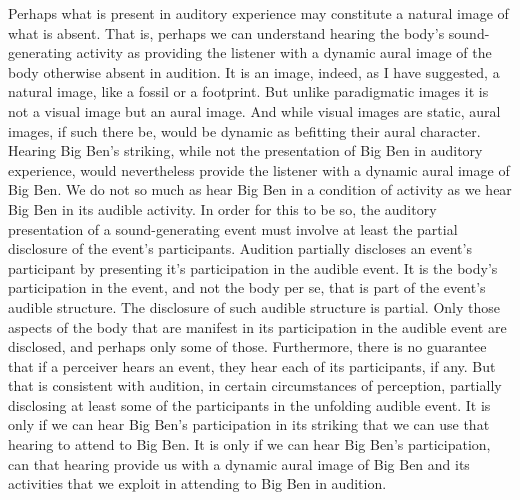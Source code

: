 \documentclass[12pt]{article}
\begin{document}
Perhaps what is present in auditory experience may constitute a natural image of what is absent. That is, perhaps we can understand hearing the body’s sound-generating activity as providing the listener with a dynamic aural image of the body otherwise absent in audition. It is an image, indeed, as I have suggested, a natural image, like a fossil or a footprint. But unlike paradigmatic images it is not a visual image but an aural image. And while visual images are static, aural images, if such there be, would be dynamic as befitting their aural character. Hearing Big Ben’s striking, while not the presentation of Big Ben in auditory experience, would nevertheless provide the listener with a dynamic aural image of Big Ben. We do not so much as hear Big Ben in a condition of activity as we hear Big Ben in its audible activity. In order for this to be so, the auditory presentation of a sound-generating event must involve at least the partial disclosure of the event’s participants. Audition partially discloses an event’s participant by presenting it's participation in the audible event. It is the body’s participation in the event, and not the body per se, that is part of the event’s audible structure. The disclosure of such audible structure is partial. Only those aspects of the body that are manifest in its participation in the audible event are disclosed, and perhaps only some of those. Furthermore, there is no guarantee that if a perceiver hears an event, they hear each of its participants, if any. But that is consistent with audition, in certain circumstances of perception, partially disclosing at least some of the participants in the unfolding audible event. It is only if we can hear Big Ben’s participation in its striking that we can use that hearing to attend to Big Ben. It is only if we can hear Big Ben’s participation, can that hearing provide us with a dynamic aural image of Big Ben and its activities that we exploit in attending to Big Ben in audition.
\end{document}
